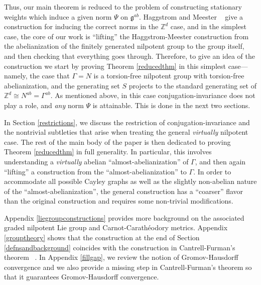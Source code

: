 \documentclass[12pt,reqno]{article}
\numberwithin{equation}{section}
\newcommand{\Z}{\mathbb{Z}}
\newcommand{\g}{\mathfrak{g}}
\begin{document}
Thus, our main theorem is reduced to the problem of constructing stationary weights which induce a given norm $\Psi$ on $\g^{ab}$.
Haggstrom and Meester ~\cite{HaggstromMeester} give a construction for inducing the correct norms in the $\Z^d$ case, and
in the simplest case, the core
of our work is 
``lifting'' the Haggstrom-Meester construction from the abelianization of the finitely generated nilpotent group to the group itself, and then 
checking that
everything goes through.
Therefore, to give an idea of the construction
we start by proving Theorem \ref{reducedthm} in this simplest case---namely, the case that $\Gamma=N$ is a torsion-free nilpotent group
with torsion-free abelianization, and the generating set $S$ projects to the standard generating set of
$\Z^d \cong N^{ab} = \Gamma^{ab}$. As mentioned above, in this case conjugation-invariance does not play a role, and \emph{any}
norm $\Psi$ is attainable.
This is done in the next two sections.  

In Section \ref{restrictions}, we discuss the restriction of conjugation-invariance and the
nontrivial subtleties that arise when treating the general \emph{virtually} nilpotent case.
The rest of the main body of the paper is then dedicated to proving Theorem \ref{reducedthm} in full generality.
In particular, this involves understanding a \emph{virtually} abelian ``almost-abelianization'' of $\Gamma$, and
then again ``lifting'' a construction from the ``almost-abelianization'' to $\Gamma$.
In order to accommodate all possible Cayley graphs
as well as the slightly non-abelian nature of the ``almost-abelianization'',
the general construction has a ``coarser'' flavor than the original construction and requires some non-trivial modifications.




Appendix \ref{liegroupconstructions} provides more background on the associated graded nilpotent Lie group and Carnot-Carath\'eodory metrics.
Appendix \ref{grouptheory} shows that the construction at the end of Section \ref{defnsandbackground} coincides with the construction
in Cantrell-Furman's theorem ~\cite{CantrellFurman}.
In Appendix \ref{fillgap}, we review the notion of Gromov-Hausdorff convergence and we also provide a missing step in Cantrell-Furman's theorem so that it guarantees Gromov-Hausdorff convergence. 


 
 
 
 
 
 
 
 
\end{document}
